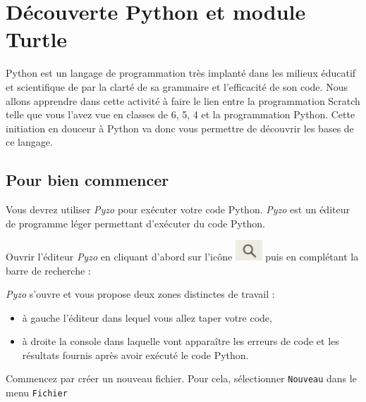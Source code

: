 \newpage

\section{Découverte Python et module Turtle}

Python est un langage de programmation très implanté dans les milieux éducatif et scientifique de par la clarté de sa grammaire et l'efficacité de son code. Nous allons apprendre dans cette activité à faire le lien entre la programmation Scratch telle que vous l'avez vue en classes de 6, 5, 4 et la programmation Python. Cette initiation en douceur à Python va donc vous permettre de découvrir les bases de ce langage. 

\subsection{Pour bien commencer}

Vous devrez utiliser \emph{Pyzo} pour exécuter votre code Python. \emph{Pyzo} est un éditeur de programme léger permettant d'exécuter du code Python. 

Ouvrir l'éditeur \emph{Pyzo} en cliquant d'abord sur l'icône \includegraphics[width=1cm]{./images/activite7/icone_recherche} puis en complétant la barre de recherche : 


\emph{Pyzo} s'ouvre et vous propose deux zones distinctes de travail :
\begin{itemize}
\item à gauche l'éditeur dans lequel vous allez taper votre code,
\item à droite la console dans laquelle vont apparaître les erreurs de code et les résultats fournis après avoir exécuté le code Python.
\end{itemize}


Commencez par créer un nouveau fichier. Pour cela, sélectionner \texttt{Nouveau} dans le menu \texttt{Fichier}


